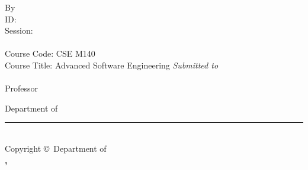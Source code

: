 \begin{titlepage}
    \linespread{1.75}
    \begin{center}
        \large
        {\Huge\textbf{\thesistitle}}
        \ifdefined\ARCTHIRDCOPY
            \vfill By \vfill
            \textbf{\MakeUppercase{\myname}} \\ ID: \mystdid \\ Session: \mysession \\ \textbf{\itshape \mydegree}
            \\ Course Code: CSE M140 \\ Course Title: Advanced Software Engineering
            \vfill {} \vfill
            {\itshape\Large Submitted to} \\
            {\textbf{\supervisorname}} \\ Professor \vfill
        \else
            \vfill {} \vfill
        \fi

        \vfill Department of {\textbf{\deptname \\
        \institutename}} \vfill
        \noindent\rule{\textwidth}{1pt} \\
        Copyright \copyright \ Department of \\
        \textbf{\deptname, \institutename} \\ \mydate
    \end{center}
    \restoregeometry
\end{titlepage}

